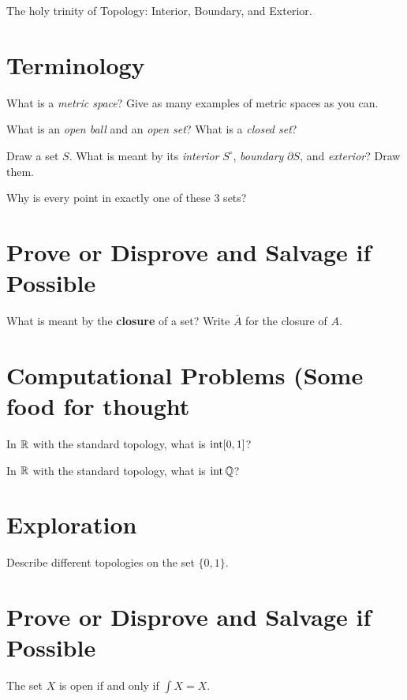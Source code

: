 \documentclass{homework}
\author{Names of Contributors}
\begin{document}
\maketitle

\begin{inspiration}
  The holy trinity of Topology: Interior, Boundary, and Exterior.
\end{inspiration}

\section{Terminology}

\begin{problem}
  What is a \textit{metric space}? Give as many examples of metric spaces as you can.
  \label{metric-space}
\end{problem}

\begin{problem}
  What is an \textit{open ball} and an \textit{open set}? What is a \textit{closed set}?
\end{problem}

\begin{problem}
  Draw a set $S$. What is meant by its \textit{interior} $S^\circ$, \textit{boundary} $\partial S$, and \textit{exterior}? Draw them.

  Why is every point in exactly one of these 3 sets?
\end{problem}

\section{Prove or Disprove and Salvage if Possible}

\begin{problem}
  What is meant by the \textbf{closure} of a set?  Write $\bar{A}$ for the closure of $A$.
\end{problem}

\section{Computational Problems (Some food for thought}

\begin{problem}
  In $\mathbb{R}$ with the standard topology, what is
  $\operatorname{int} [0,1]$?
\end{problem}

\begin{problem}
  In $\mathbb{R}$ with the standard topology, what is
  $\operatorname{int} \mathbb{Q}$?
\end{problem}

\section{Exploration}

\begin{problem}
  Describe different topologies on the set $\{ 0, 1 \}$.
\end{problem}

\section{Prove or Disprove and Salvage if Possible}

\begin{problem}
  The set $X$ is open if and only if $\int X = X$.
\end{problem}
\end{document}
